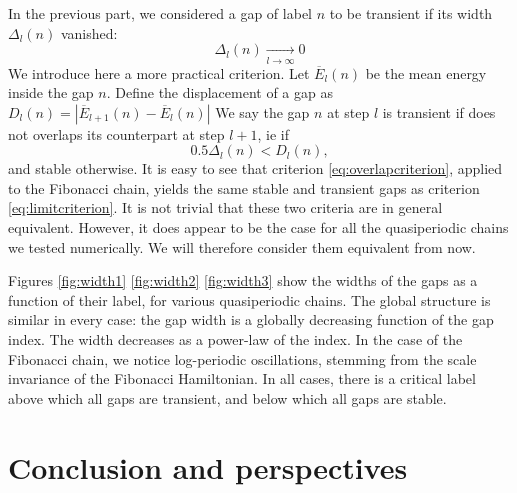 \documentclass[a4paper]{jpconf}
\begin{document}
In the previous part, we considered a gap of label $n$ to be transient if its width $\Delta_l(n)$ vanished:
\begin{equation}
\label{eq:limitcriterion}
	\Delta_l(n) \xrightarrow[l \to \infty]{} 0
\end{equation}
We introduce here a more practical criterion.
Let $\overline{E}_l(n)$ be the mean energy inside the gap $n$.
Define the displacement of a gap as $D_l(n) = |\overline{E}_{l+1}(n) - \overline{E}_l(n)| $
We say the gap $n$ at step $l$ is transient if does not overlaps its counterpart at step $l+1$, ie if 
\begin{equation}
\label{eq:overlapcriterion}
	0.5 \Delta_l(n) < D_l(n),
\end{equation}
and stable otherwise.
It is easy to see that criterion \eqref{eq:overlapcriterion}, applied to the Fibonacci chain, yields the same stable and transient gaps as criterion \eqref{eq:limitcriterion}.
It is not trivial that these two criteria are in general equivalent.
However, it does appear to be the case for all the quasiperiodic chains we tested numerically. 
We will therefore consider them equivalent from now.

Figures \eqref{fig:width1} \eqref{fig:width2} \eqref{fig:width3} show the widths of the gaps as a function of their label, for various quasiperiodic chains.
The global structure is similar in every case: the gap width is a globally decreasing function of the gap index. 
The width decreases as a power-law of the index.
In the case of the Fibonacci chain, we notice log-periodic oscillations, stemming from the scale invariance of the Fibonacci Hamiltonian.
In all cases, there is a critical label above which all gaps are transient, and below which all gaps are stable.



\section*{Conclusion and perspectives}
\end{document}

